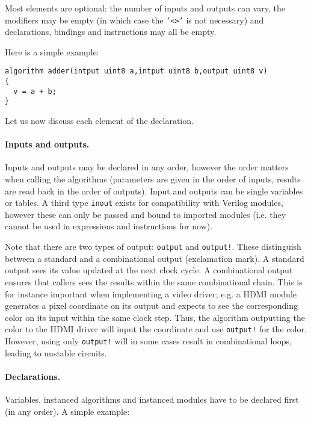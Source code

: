 \documentclass[a4]{article}
\newcommand\verilog{Verilog}
\begin{document}
Most elements are optional: the number of inputs and outputs can vary, the modifiers may be empty (in which case the \texttt{'<>'} is not necessary) and declarations, bindings and instructions may all be empty.

Here is a simple example:
\begin{verbatim}
algorithm adder(intput uint8 a,intput uint8 b,output uint8 v)
{
  v = a + b;
}
\end{verbatim}

\noindent Let us now discuss each element of the declaration.


\paragraph{Inputs and outputs.}

Inputs and outputs may be declared in any order, however the order matters when calling the algorithms (parameters are given in the order of inputs, results are read back in the order of outputs). Input and outputs can be single variables or tables.
A third type \texttt{inout} exists for compatibility with \verilog{} modules, however these can only be passed and bound to imported modules (i.e. they cannot be used in expressions and instructions for now).

Note that there are two types of output: \texttt{output} and \texttt{output!}. These distinguish between a standard and a combinational output (exclamation mark). A standard output sees its value updated at the next clock cycle. A combinational output ensures that callers sees the results within the same combinational chain. This is for instance important when implementing a video driver; e.g. a HDMI module generates a pixel coordinate on its output and expects to see the corresponding color on its input within the same clock step. Thus, the algorithm outputting the color to the HDMI driver will input the coordinate and use \texttt{output!} for the color. However, using only \texttt{output!} will in some cases result in combinational loops, leading to unstable circuits.


\paragraph{Declarations.} Variables, instanced algorithms and instanced modules have to be declared first (in any order). A simple example:
\end{document}
